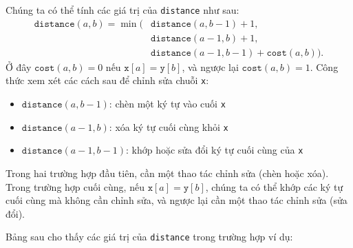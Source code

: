 Chúng ta có thể tính các giá trị của \texttt{distance}
như sau:
\begin{equation*}
\begin{split}
\texttt{distance}(a,b) = \min(& \texttt{distance}(a,b-1)+1, \\
                           & \texttt{distance}(a-1,b)+1, \\
                           & \texttt{distance}(a-1,b-1)+\texttt{cost}(a,b)).
\end{split}
\end{equation*}
Ở đây $\texttt{cost}(a,b)=0$ nếu $\texttt{x}[a]=\texttt{y}[b]$,
và ngược lại $\texttt{cost}(a,b)=1$.
Công thức xem xét các cách sau để
chỉnh sửa chuỗi \texttt{x}:
\begin{itemize}
\item $\texttt{distance}(a,b-1)$: chèn một ký tự vào cuối \texttt{x}
\item $\texttt{distance}(a-1,b)$: xóa ký tự cuối cùng khỏi \texttt{x}
\item $\texttt{distance}(a-1,b-1)$: khớp hoặc sửa đổi ký tự cuối cùng của \texttt{x}
\end{itemize}
Trong hai trường hợp đầu tiên, cần một thao tác chỉnh sửa
(chèn hoặc xóa).
Trong trường hợp cuối cùng, nếu $\texttt{x}[a]=\texttt{y}[b]$,
chúng ta có thể khớp các ký tự cuối cùng mà không cần chỉnh sửa,
và ngược lại cần một thao tác chỉnh sửa (sửa đổi).

Bảng sau cho thấy các giá trị của \texttt{distance}
trong trường hợp ví dụ:
\begin{center}
\end{center}

